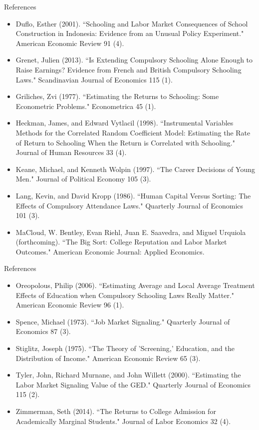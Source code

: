 \documentclass[blue]{beamer}
\begin{document}
{{{\begin{frame}{References}
\begin{scriptsize}
\begin{itemize}
\item Duflo, Esther (2001). ``Schooling and Labor Market Consequences of School Construction in Indonesia: Evidence from an Unusual Policy Experiment." American Economic Review 91 (4).
\item Grenet, Julien (2013). ``Is Extending Compulsory Schooling Alone Enough to Raise Earnings? Evidence from French and British Compulsory Schooling Laws." Scandinavian Journal of Economics 115 (1).
\item Griliches, Zvi (1977). ``Estimating the Returns to Schooling: Some Econometric Problems." Econometrica 45 (1).
\item Heckman, James, and Edward Vytlacil (1998). ``Instrumental Variables Methods for the Correlated Random Coefficient Model: Estimating the Rate of Return to Schooling When the Return is Correlated with Schooling." Journal of Human Resources 33 (4).
\item Keane, Michael, and Kenneth Wolpin (1997). ``The Career Decisions of Young Men." Journal of Political Economy 105 (3). 
\item Lang, Kevin, and David Kropp (1986). ``Human Capital Versus Sorting: The Effects of Compulsory Attendance Laws." Quarterly Journal of Economics 101 (3). 
\item MaCloud, W. Bentley, Evan Riehl, Juan E. Saavedra, and Miguel Urquiola (forthcoming). ``The Big Sort: College Reputation and Labor Market Outcomes." American Economic Journal: Applied Economics.
\end{itemize}
\end{scriptsize}
\end{frame}

\begin{frame}{References}
\begin{scriptsize}
\begin{itemize}
\item Oreopolous, Philip (2006). ``Estimating Average and Local Average Treatment Effects of Education when Compulsory Schooling Laws Really Matter." American Economic Review 96 (1).
\item Spence, Michael (1973). ``Job Market Signaling." Quarterly Journal of Economics 87 (3).
\item Stiglitz, Joseph (1975). ``The Theory of 'Screening,' Education, and the Distribution of Income." American Economic Review 65 (3).
\item Tyler, John, Richard Murnane, and John Willett (2000). ``Estimating the Labor Market Signaling Value of the GED." Quarterly Journal of Economics 115 (2). 
\item Zimmerman, Seth (2014). ``The Returns to College Admission for Academically Marginal Students." Journal of Labor Economics 32 (4).
\end{itemize}
\end{scriptsize}
\end{frame}

}}}
\end{document}
